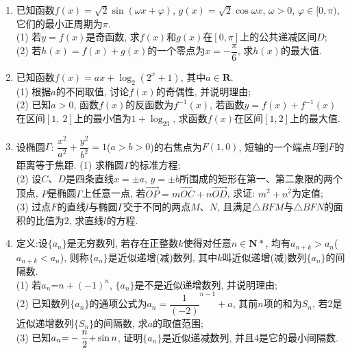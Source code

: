 \documentclass[10pt,a4paper]{article}
\begin{document}
\begin{enumerate}[1.]
\begin{center}
\end{center}
(1) 若三棱柱$ABC-A_1B_1C_1$的体积为$3\sqrt 3$, 求三棱柱$ABC-A_1B_1C_1$的高;\\
(2) 若$C_1C=2$, 求二面角$D-B_1C_1-A_1$的大小.
\item 已知函数$f(x)=\sqrt 2\sin (\omega x+\varphi)$, $g(x)=\sqrt 2\cos \omega x$, $\omega >0$, $\varphi \in [0,\pi)$, 它们的最小正周期为$\pi$.\\
(1) 若$y=f(x)$是奇函数, 求$f(x)$和$g(x)$在$[0,\pi]$上的公共递减区间$D$;\\
(2) 若$h(x)=f(x)+g(x)$的一个零点为$x=-\dfrac{\pi}6$, 求$h(x)$的最大值.
\item 已知函数$f(x)=ax+\log_2(2^x+1)$, 其中$a\in \mathbf{R}$.\\
(1) 根据$a$的不同取值, 讨论$f(x)$的奇偶性, 并说明理由;\\
(2) 已知$a>0$, 函数$f(x)$的反函数为${f^{-1}}(x)$, 若函数$y=f(x)+{f^{-1}}(x)$在区间$[1,\ 2]$上的最小值为$1+\log_23$, 求函数$f(x)$在区间$[1,2]$上的最大值.
\item 设椭圆$\Gamma$: $\dfrac{x^2}{a^2}+\dfrac{y^2}{b^2}=1$($a>b>0$)的右焦点为$F(1, 0)$, 短轴的一个端点$B$到$F$的距离等于焦距.
(1) 求椭圆$\Gamma$的标准方程;\\
(2) 设$C$、$D$是四条直线$x=\pm a$, $y=\pm b$所围成的矩形在第一、第二象限的两个顶点, $P$是椭圆$\Gamma$上任意一点, 若$\overrightarrow{OP}=m\overrightarrow{OC}+n\overrightarrow{OD}$, 求证: $m^2+n^2$为定值;\\
(3) 过点$F$的直线$l$与椭圆$\Gamma$交于不同的两点$M$、$N$, 且满足$\triangle BFM$与$\triangle BFN$的面积的比值为$2$, 求直线$l$的方程.
\item 定义:设$\{a_n\}$是无穷数列, 若存在正整数$k$使得对任意$n\in \mathbf{N}*$, 均有${a_{n+k}}>{a_n}$(${a_{n+k}}<{a_n}$), 则称$\{a_n\}$是近似递增(减)数列, 其中$k$叫近似递增(减)数列$\{a_n\}$的间隔数.\\
(1) 若$a_n\text{=}n+(-1)^n$, $\{ {a_n} \}$是不是近似递增数列, 并说明理由;\\
(2) 已知数列$\{ {a_n} \}$的通项公式为$a_n=\dfrac 1{(-2)}^{n-1}+a$, 其前$n$项的和为$S_n$, 若2是近似递增数列$\{ {S_n} \}$的间隔数, 求$a$的取值范围;\\
(3) 已知$a_n\text{=}-\dfrac n{\text2}\text+\sin n$, 证明$\{ {a_n} \}$是近似递减数列, 并且4是它的最小间隔数.


\end{enumerate}
\end{document}
